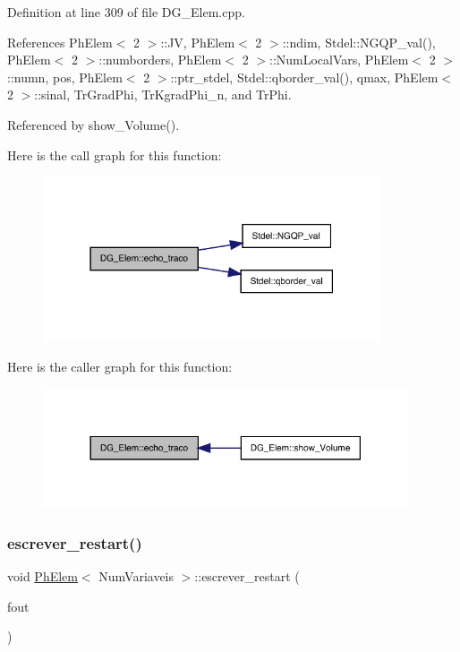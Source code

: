 Definition at line 309 of file D\+G\+\_\+\+Elem.\+cpp.



References Ph\+Elem$<$ 2 $>$\+::\+JV, Ph\+Elem$<$ 2 $>$\+::ndim, Stdel\+::\+N\+G\+Q\+P\+\_\+val(), Ph\+Elem$<$ 2 $>$\+::numborders, Ph\+Elem$<$ 2 $>$\+::\+Num\+Local\+Vars, Ph\+Elem$<$ 2 $>$\+::numn, pos, Ph\+Elem$<$ 2 $>$\+::ptr\+\_\+stdel, Stdel\+::qborder\+\_\+val(), qmax, Ph\+Elem$<$ 2 $>$\+::sinal, Tr\+Grad\+Phi, Tr\+Kgrad\+Phi\+\_\+n, and Tr\+Phi.



Referenced by show\+\_\+\+Volume().

Here is the call graph for this function\+:
\nopagebreak
\begin{figure}[H]
\begin{center}
\leavevmode
\includegraphics[width=283pt]{classDG__Elem_ab5d89b8f7625699239440bfd0e8ec6e6_cgraph}
\end{center}
\end{figure}
Here is the caller graph for this function\+:
\nopagebreak
\begin{figure}[H]
\begin{center}
\leavevmode
\includegraphics[width=306pt]{classDG__Elem_ab5d89b8f7625699239440bfd0e8ec6e6_icgraph}
\end{center}
\end{figure}
\mbox{\label{classPhElem_a11a736e86c5b40e5b0a4c84754f2b066}} 
\subsubsection{\texorpdfstring{escrever\+\_\+restart()}{escrever\_restart()}}
{\footnotesize\ttfamily void \hyperlink{classPhElem}{Ph\+Elem}$<$ Num\+Variaveis $>$\+::escrever\+\_\+restart (\begin{DoxyParamCaption}\item[{F\+I\+LE $\ast$}]{fout }\end{DoxyParamCaption})\hspace{0.3cm}{\ttfamily [inherited]}}



